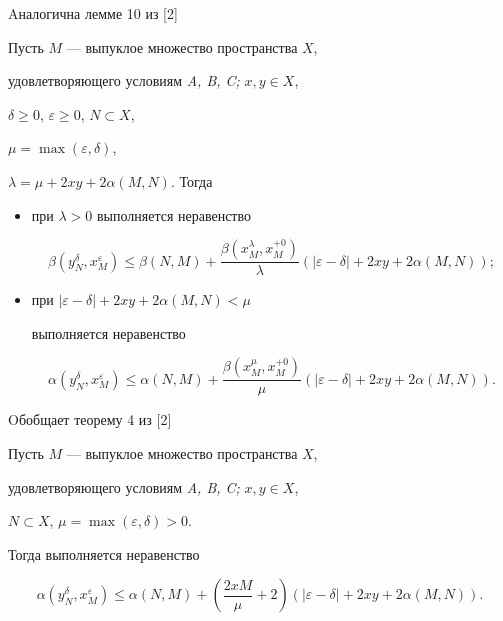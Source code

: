 Aналогична лемме 10 из [2]





\begin{lem}


Пусть $M$ --- выпуклое множество пространства $X$, 


удовлетворяющего условиям {\em A, B, C;} $x, y \in X$,


$\delta \geq 0 $, $\varepsilon \geq 0$, $N \subset X$,


$\mu =\max (\varepsilon,\delta)$,


$\lambda = \mu + 2xy + 2\alpha (M,N)$. Тогда 


\begin{itemize}


\item[a)] при $\lambda > 0$ выполняется неравенство


$$


\beta (y_{N}^{\delta },x_{M}^{\varepsilon }) \leq \beta (N,M) +


\frac{\beta (x_{M}^{\lambda },x_{M}^{+ 0})}{\lambda }


(|\varepsilon - \delta | + 2xy + 2\alpha (M,N));


$$


\item[b)] при $|\varepsilon - \delta | + 2xy + 2\alpha (M,N) < \mu $


выполняется неравенство


$$


\alpha (y_{N}^{\delta },x_{M}^{\varepsilon }) \leq \alpha (N,M) +


\frac{\beta (x_{M}^{\mu },x_{M}^{+ 0})}{\mu }(|\varepsilon - \delta |


+ 2xy + 2\alpha (M,N)). 


$$


\end{itemize}


\end{lem}





Oбобщает теорему 4 из [2]





\begin{thm}


Пусть $M$ --- выпуклое множество пространства $X$, 


удовлетворяющего условиям {\em A, B, C;} $x,  y \in X$,


$N \subset X$, $\mu =\max (\varepsilon,\delta) > 0$.


Тогда выполняется неравенство


$$


\alpha (y_{N}^{\delta },x_{M}^{\varepsilon }) \leq \alpha (N,M) + 


(\frac{2xM}{\mu } + 2)(|\varepsilon - \delta | + 2xy + 2\alpha (M,N)). 


$$


\end{thm}





